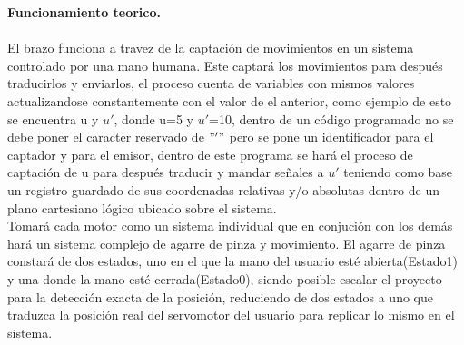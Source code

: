 \documentclass[letterpaper]{article}
\begin{document}
\begin{large}
\textbf{Funcionamiento teorico.}\\\\
El brazo funciona a travez de la captación de movimientos en un sistema controlado por una mano humana. Este captará los movimientos para después traducirlos y enviarlos, el proceso cuenta de variables con mismos valores actualizandose constantemente con el valor de el anterior, como ejemplo de esto se encuentra u y $u'$, donde u=5 y $u'$=10, dentro de un código programado no se debe poner el caracter reservado de $" ' "$ pero se pone un identificador para el captador y para el emisor, dentro de este programa se hará el proceso de captación de u para después traducir y mandar señales a $u'$ teniendo como base un registro guardado de sus coordenadas relativas y/o absolutas dentro de un plano cartesiano lógico ubicado sobre el sistema. \\
Tomará cada motor como un sistema individual que en conjución con los demás hará un sistema complejo de agarre de pinza y movimiento. El agarre de pinza constará de dos estados, uno en el que la mano del usuario esté abierta(Estado1) y una donde la mano esté cerrada(Estado0), siendo posible escalar el proyecto para la detección exacta de la posición, reduciendo de dos estados a uno que traduzca la posición real del servomotor del usuario para replicar lo mismo en el sistema.
\\
\end{large}
\newpage
\end{document}
